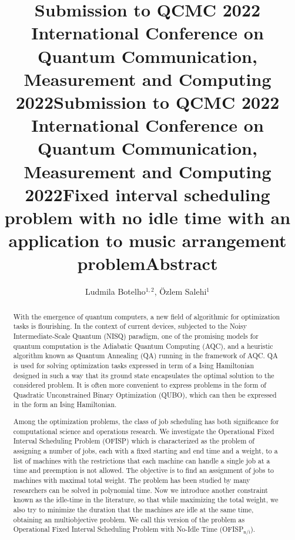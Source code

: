 \documentclass[aps,reprint]{revtex4-2}
\title@column %
\title{\normalsize Submission to QCMC 2022 \\ %
            International Conference on Quantum Communication,\\ 
            Measurement and Computing 2022}
\makeatletter
\newcommand{\printentry}{%
    \@author@finish%
    \title@column %
    \titleblock@produce %
    \suppressfloats[t] %
    \let\@AAC@list\@empty %
    \let\@AFF@list\@empty %
    \let\@AFG@list\@empty %
    \let\@address\@empty %
    \titlepage@sw %
    {\vfil\clearpage}%
}
\newcommand{\printheader}{%
    \title{\normalsize Submission to QCMC 2022 \\ %
            International Conference on Quantum Communication,\\ 
            Measurement and Computing 2022}
    \printentry
}
\makeatother
\begin{document}
\printheader



\title{Fixed interval scheduling problem with no idle time with an application to music arrangement problem} %
\author{Ludmila Botelho$^{1,2}$, \"Ozlem Salehi$^{1}$} %
{} %

\printentry
\title{\small Abstract}
\begin{abstract}
  
With the emergence of quantum computers, a new field of algorithmic for optimization tasks is flourishing. In the context of current devices, subjected to the Noisy Intermediate-Scale Quantum (NISQ) paradigm, one of the promising models for quantum computation is the Adiabatic Quantum Computing (AQC), and a heuristic algorithm known as Quantum Annealing (QA) running in the framework of AQC. QA is used for solving optimization tasks expressed in term of a Ising Hamiltonian designed in such a way that its ground state encapsulates the optimal solution to the considered problem. It is often more convenient to express problems in the form of Quadratic Unconstrained Binary Optimization (QUBO), which can then be expressed in the form an Ising Hamiltonian.

Among the optimization problems, the class of job scheduling has both significance for computational science and operations research. We investigate the Operational Fixed Interval Scheduling Problem (OFISP) which is characterized as the problem of assigning a number of jobs, each with a fixed starting and end time and a weight, to a list of machines with the restrictions that each machine can handle a single job at a time and preemption is not allowed. The objective is to find an assignment of jobs to machines with maximal total weight. The problem has been studied by many researchers can be solved in polynomial time. Now we introduce another constraint known as the idle-time in the literature, so that while maximizing the total weight, we also try to minimize the duration that the machines are idle at the same time, obtaining an multiobjective problem. We call this version of the problem as Operational Fixed Interval Scheduling Problem with No-Idle Time (OFISP$_\text{n/i}$).   


\end{abstract}
\end{document}
